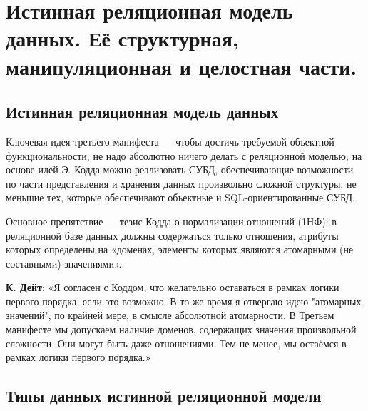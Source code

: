 \documentclass[a4paper,12pt]{article}
\begin{document}
\section{Истинная реляционная модель данных. Её структурная, манипуляционная и целостная части.}

\subsection{Истинная реляционная модель данных}

Ключевая идея третьего манифеста --- чтобы достичь требуемой объектной функциональности, не надо абсолютно ничего делать с реляционной моделью; на основе идей Э. Кодда можно реализовать СУБД, обеспечивающие возможности по части представления и хранения данных произвольно сложной структуры, не меньшие тех, которые обеспечивают объектные и SQL-ориентированные СУБД.

Основное препятствие --- тезис Кодда о нормализации отношений (1НФ): в реляционной базе данных должны содержаться только отношения, атрибуты которых определены на «доменах, элементы которых являются атомарными (не составными) значениями».

\textbf{К. Дейт}: «Я согласен с Коддом, что желательно оставаться в рамках логики первого порядка, если это возможно. В то же время я отвергаю идею "атомарных значений", по крайней мере, в смысле абсолютной атомарности. В Третьем манифесте мы допускаем наличие доменов, содержащих значения произвольной сложности. Они могут быть даже отношениями. Тем не менее, мы остаёмся в рамках логики первого порядка.»

\subsection{Типы данных истинной реляционной модели}
\end{document}
